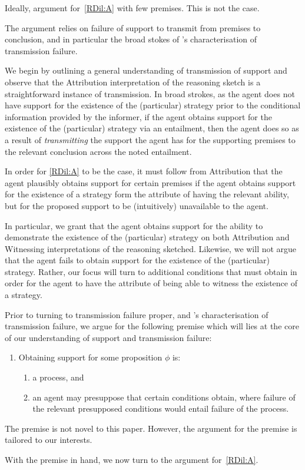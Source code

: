 \documentclass[10pt]{article}
\newcommand{\WR}[0]{\textsf{Witnessing}}
\newcommand{\AR}[0]{\textsf{Attribution}}
\begin{document}
\begin{note}
  Ideally, argument for~\ref{RDil:A} with few premises.
  This is not the case.

  The argument relies on failure of support to transmit from premises to conclusion, and in particular the broad stokes of \citeauthor{Wright:2016wl}'s characterisation of transmission failure.

  We begin by outlining a general understanding of transmission of support and observe that the \AR{} interpretation of the reasoning sketch is a straightforward instance of transmission.
  In broad strokes, as the agent does not have support for the existence of the (particular) strategy prior to the conditional information provided by the informer, if the agent obtains support for the existence of the (particular) strategy via an entailment, then the agent does so as a result of \emph{transmitting} the support the agent has for the supporting premises to the relevant conclusion across the noted entailment.

  In order for \ref{RDil:A} to be the case, it must follow from \AR{} that the agent plausibly obtains support for certain premises if the agent obtains support for the existence of a strategy form the attribute of having the relevant ability, but for the proposed support to be (intuitively) unavailable to the agent.

  In particular, we grant that the agent obtains support for the ability to demonstrate the existence of the (particular) strategy on both \AR{} and \WR{} interpretations of the reasoning sketched.
  Likewise, we will not argue that the agent fails to obtain support for the existence of the (particular) strategy.
  Rather, our focus will turn to additional conditions that must obtain in order for the agent to have the attribute of being able to witness the existence of a strategy.

  Prior to turning to transmission failure proper, and \citeauthor{Wright:2016wl}'s characterisation of transmission failure, we argue for the following premise which will lies at the core of our understanding of support and transmission failure:
    \begin{enumerate}[label=(A\arabic*), ref=(A\arabic*)]
  \item\label{Att:Prem:Presupp}
    Obtaining support for some proposition \(\phi\) is:
    \begin{enumerate}
    \item\label{Att:Prem:Presupp:1} a process, and
    \item\label{Att:Prem:Presupp:2} an agent may presuppose that certain conditions obtain, where failure of the relevant presupposed conditions would entail failure of the process.
    \end{enumerate}
  \end{enumerate}
  The premise is not novel to this paper.
  However, the argument for the premise is tailored to our interests.

  With the premise in hand, we now turn to the argument for~\ref{RDil:A}.
\end{note}
\end{document}
